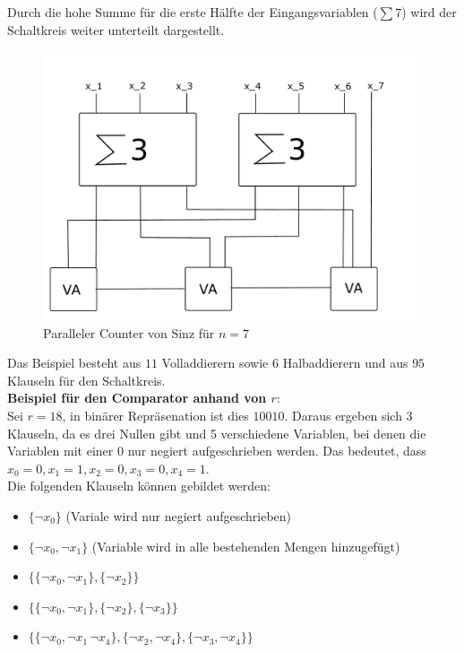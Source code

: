 \documentclass[a4,abstract=on]{scrartcl}
\begin{document}
Durch die hohe Summe für die erste Hälfte der Eingangsvariablen ($\sum7$) wird der Schaltkreis weiter unterteilt dargestellt.

\begin{figure}[H]
\centering
\includegraphics[width=\textwidth]{Bsp_Sinz_fein.pdf}
\caption{Paralleler Counter von Sinz für $n=7$}
\label{fig:sinz_counter_para_bsp}
\end{figure}

Das Beispiel besteht aus $11$ Volladdierern sowie 6 Halbaddierern und aus $95$ Klauseln für den Schaltkreis.\\

\textbf{Beispiel für den Comparator anhand von $r$}:\\
Sei $r = 18$, in binärer Repräsenation ist dies $10010$. Daraus ergeben sich 3 Klauseln, da es drei Nullen gibt und 5 verschiedene Variablen, bei denen die Variablen mit einer $0$ nur negiert aufgeschrieben werden. Das bedeutet, dass $x_0 = 0, x_1 = 1, x_2 = 0, x_3 = 0, x_4 = 1$.\\
Die folgenden Klauseln können gebildet werden:\\
\begin{itemize}
\item $\{\neg x_0\}$ (Variale wird nur negiert aufgeschrieben)
\item  $\{\neg x_0,\neg x_1\}$ (Variable wird in alle bestehenden Mengen hinzugefügt)
\item $\{\{\neg x_0, \neg x_1\},\{\neg x_2\}\}$
\item $\{\{\neg x_0, \neg x_1\},\{\neg x_2\}, \{\neg x_3\}\}$
\item $\{\{\neg x_0, \neg x_1\, \neg x_4\},\{\neg x_2, \neg x_4\}, \{\neg x_3, \neg x_4\}\}$
\end{itemize}
\end{document}
